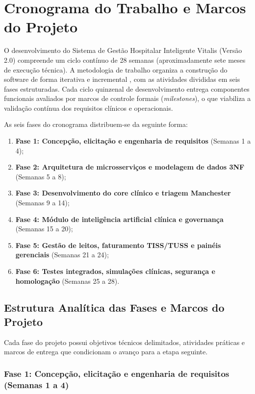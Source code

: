 \section{Cronograma do Trabalho e Marcos do Projeto}

O desenvolvimento do Sistema de Gestão Hospitalar Inteligente Vitalis (Versão 2.0) compreende um ciclo contínuo de 28 semanas (aproximadamente sete meses de execução técnica). A metodologia de trabalho organiza a construção do software de forma iterativa e incremental \cite{pressman:2016, sommerville:2019}, com as atividades divididas em seis fases estruturadas. Cada ciclo quinzenal de desenvolvimento entrega componentes funcionais avaliados por marcos de controle formais (\textit{milestones}), o que viabiliza a validação contínua dos requisitos clínicos e operacionais.

As seis fases do cronograma distribuem-se da seguinte forma:
\begin{enumerate}[leftmargin=*]
    \item \textbf{Fase 1: Concepção, elicitação e engenharia de requisitos} (Semanas 1 a 4);
    \item \textbf{Fase 2: Arquitetura de microsserviços e modelagem de dados 3NF} (Semanas 5 a 8);
    \item \textbf{Fase 3: Desenvolvimento do core clínico e triagem Manchester} (Semanas 9 a 14);
    \item \textbf{Fase 4: Módulo de inteligência artificial clínica e governança} (Semanas 15 a 20);
    \item \textbf{Fase 5: Gestão de leitos, faturamento TISS/TUSS e painéis gerenciais} (Semanas 21 a 24);
    \item \textbf{Fase 6: Testes integrados, simulações clínicas, segurança e homologação} (Semanas 25 a 28).
\end{enumerate}

\subsection{Estrutura Analítica das Fases e Marcos do Projeto}

Cada fase do projeto possui objetivos técnicos delimitados, atividades práticas e marcos de entrega que condicionam o avanço para a etapa seguinte.

\subsubsection{Fase 1: Concepção, elicitação e engenharia de requisitos (Semanas 1 a 4)}

